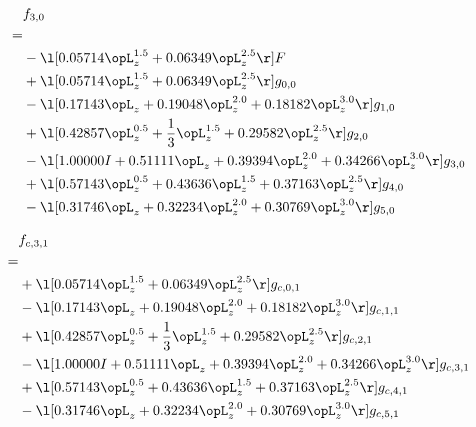 \begin{alignat}{2} 
\label{eq:f_30_0} 
& f_{3,0} \nonumber \\ 
 = \\ 
& - \l[  0.05714 \opL_z^{1.5} +  0.06349 \opL_z^{2.5}  \r] F \nonumber \\ 
& + \l[  0.05714 \opL_z^{1.5} +  0.06349 \opL_z^{2.5}  \r] g_{0,0} \nonumber \\ 
& - \l[  0.17143 \opL_z +  0.19048 \opL_z^{2.0} +  0.18182 \opL_z^{3.0}  \r] g_{1,0} \nonumber \\ 
& + \l[  0.42857 \opL_z^{0.5} + \frac{1}{3} \opL_z^{1.5} +  0.29582 \opL_z^{2.5}  \r] g_{2,0} \nonumber \\ 
& - \l[  1.00000 I +  0.51111 \opL_z +  0.39394 \opL_z^{2.0} +  0.34266 \opL_z^{3.0}  \r] g_{3,0} \nonumber \\ 
& + \l[  0.57143 \opL_z^{0.5} +  0.43636 \opL_z^{1.5} +  0.37163 \opL_z^{2.5}  \r] g_{4,0} \nonumber \\ 
& - \l[  0.31746 \opL_z +  0.32234 \opL_z^{2.0} +  0.30769 \opL_z^{3.0}  \r] g_{5,0} \nonumber \\ 
\end{alignat} 


\begin{alignat}{2} 
\label{eq:f_31_0} 
& f_{c,3,1} \nonumber \\ 
 = \\ 
& + \l[  0.05714 \opL_z^{1.5} +  0.06349 \opL_z^{2.5}  \r] g_{c,0,1} \nonumber \\ 
& - \l[  0.17143 \opL_z +  0.19048 \opL_z^{2.0} +  0.18182 \opL_z^{3.0}  \r] g_{c,1,1} \nonumber \\ 
& + \l[  0.42857 \opL_z^{0.5} + \frac{1}{3} \opL_z^{1.5} +  0.29582 \opL_z^{2.5}  \r] g_{c,2,1} \nonumber \\ 
& - \l[  1.00000 I +  0.51111 \opL_z +  0.39394 \opL_z^{2.0} +  0.34266 \opL_z^{3.0}  \r] g_{c,3,1} \nonumber \\ 
& + \l[  0.57143 \opL_z^{0.5} +  0.43636 \opL_z^{1.5} +  0.37163 \opL_z^{2.5}  \r] g_{c,4,1} \nonumber \\ 
& - \l[  0.31746 \opL_z +  0.32234 \opL_z^{2.0} +  0.30769 \opL_z^{3.0}  \r] g_{c,5,1} \nonumber \\ 
\end{alignat} 


